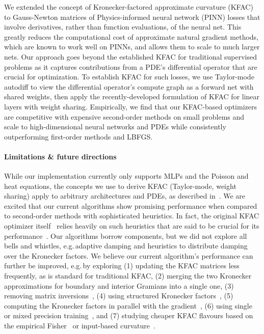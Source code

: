 We extended the concept of Kronecker-factored approximate curvature (KFAC) to Gauss-Newton matrices of Physics-informed neural network (PINN) losses that involve derivatives, rather than function evaluations, of the neural net.
This greatly reduces the computational cost of approximate natural gradient methods, which are known to work well on PINNs, and allows them to scale to much larger nets.
Our approach goes beyond the established KFAC for traditional supervised problems as it captures contributions from a PDE's differential operator that are crucial for optimization.
To establish KFAC for such losses, we use Taylor-mode autodiff to view the differential operator's compute graph as a forward net with shared weights, then apply the recently-developed formulation of KFAC for linear layers with weight sharing.
Empirically, we find that our KFAC-based optimizers are competitive with expensive second-order methods on small problems and scale to high-dimensional neural networks and PDEs while consistently outperforming first-order methods and LBFGS.

\paragraph{Limitations \& future directions} While our implementation currently only supports MLPs and the Poisson and heat equations, the concepts we use to derive KFAC (Taylor-mode, weight sharing) apply to arbitrary architectures and PDEs, as described in~.
We are excited that our current algorithms show promising performance when compared to second-order methods with sophisticated heuristics.
In fact, the original KFAC optimizer itself~\cite{martens2015optimizing} relies heavily on such heuristics that are said to be crucial for its performance~\cite{clarke2023adam}.
Our algorithms borrow components, but we did not explore all bells and whistles, e.g.\,adaptive damping and heuristics to distribute damping over the Kronecker factors.
We believe our current algorithm's performance can further be improved, e.g.\,by exploring (1) updating the KFAC matrices less frequently, as is standard for traditional KFAC, (2) merging the two Kronecker approximations for boundary and interior Gramians into a single one, (3) removing matrix inversions~\cite{lin2023simplifying}, (4) using structured Kronecker factors~\cite{lin2024structured}, (5) computing the Kronecker factors in parallel with the gradient~\cite{dangel2020backpack}, (6) using single or mixed precision training~\cite{micikevicius2017mixed}, and (7) studying cheaper KFAC flavours based on the empirical Fisher~\cite{kunstner2019limitations} or input-based curvature~\cite{benzing2022gradient,petersen2023isaac}.

